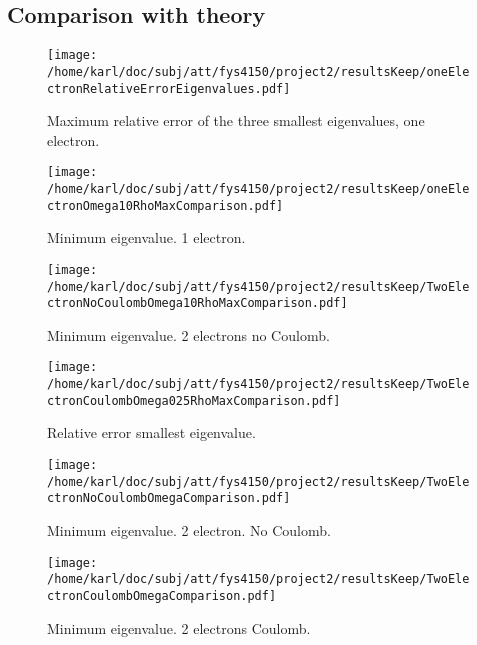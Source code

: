 \documentclass{article}
\begin{document}
\subsection{Comparison with theory}

\begin{figure}[H]
	\centering
	\texttt{[image: /home/karl/doc/subj/att/fys4150/project2/resultsKeep/oneElectronRelativeErrorEigenvalues.pdf]}
	\caption{Maximum relative error of the three smallest eigenvalues, one electron.}
	\label{1}
\end{figure}

\begin{minipage}{.49\textwidth} %
	\begin{figure}[H]
		\centering
		\texttt{[image: /home/karl/doc/subj/att/fys4150/project2/resultsKeep/oneElectronOmega10RhoMaxComparison.pdf]}
		\caption{Minimum eigenvalue. 1 electron.}
		\label{1}
	\end{figure}
\end{minipage}\hfill
\begin{minipage}{.49\textwidth}
	\begin{figure}[H]
		\centering
		\texttt{[image: /home/karl/doc/subj/att/fys4150/project2/resultsKeep/TwoElectronNoCoulombOmega10RhoMaxComparison.pdf]}
		\caption{Minimum eigenvalue. 2 electrons no Coulomb.}
		\label{1}
	\end{figure}
\end{minipage}\hfill

\begin{figure}[H]
	\centering
	\texttt{[image: /home/karl/doc/subj/att/fys4150/project2/resultsKeep/TwoElectronCoulombOmega025RhoMaxComparison.pdf]}
	\caption{Relative error smallest eigenvalue.}
	\label{1}
\end{figure}

\begin{minipage}{.49\textwidth} %
	\begin{figure}[H]
		\centering
		\texttt{[image: /home/karl/doc/subj/att/fys4150/project2/resultsKeep/TwoElectronNoCoulombOmegaComparison.pdf]}
		\caption{Minimum eigenvalue. 2 electron. No Coulomb.}
		\label{1}
	\end{figure}
\end{minipage}\hfill
\begin{minipage}{.49\textwidth}
	\begin{figure}[H]
		\centering
		\texttt{[image: /home/karl/doc/subj/att/fys4150/project2/resultsKeep/TwoElectronCoulombOmegaComparison.pdf]}
		\caption{Minimum eigenvalue. 2 electrons  Coulomb.}
		\label{1}
	\end{figure}
\end{minipage}\hfill
\end{document}
